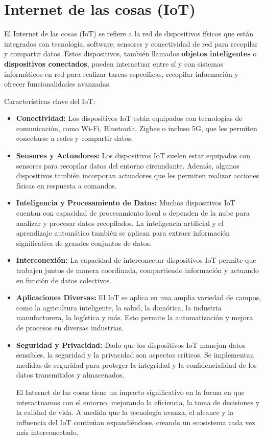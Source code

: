 \section{Internet de las cosas (IoT)}
El Internet de las cosas (IoT) se refiere a la red de dispositivos físicos que están integrados con tecnología, software, sensores y conectividad de red para recopilar y compartir datos. Estos dispositivos, también llamados \textbf{objetos inteligentes}  o \textbf{dispositivos conectados}, pueden interactuar entre sí y con sistemas informáticos en red para realizar tareas específicas, recopilar información y ofrecer funcionalidades avanzadas.

Características clave del IoT:
\begin{itemize}
\item \textbf{Conectividad:}
Los dispositivos IoT están equipados con tecnologías de comunicación, como Wi-Fi, Bluetooth, Zigbee o incluso 5G, que les permiten conectarse a redes y compartir datos.

\item \textbf{Sensores y Actuadores:}
Los dispositivos IoT suelen estar equipados con sensores para recopilar datos del entorno circundante. Además, algunos dispositivos también incorporan actuadores que les permiten realizar acciones físicas en respuesta a comandos.

\item \textbf{Inteligencia y Procesamiento de Datos:}
Muchos dispositivos IoT cuentan con capacidad de procesamiento local o dependen de la nube para analizar y procesar datos recopilados. La inteligencia artificial y el aprendizaje automático también se aplican para extraer información significativa de grandes conjuntos de datos.

\item \textbf{Interconexión:}
La capacidad de interconectar dispositivos IoT permite que trabajen juntos de manera coordinada, compartiendo información y actuando en función de datos colectivos.

\item \textbf{Aplicaciones Diversas:}
El IoT se aplica en una amplia variedad de campos, como la agricultura inteligente, la salud, la domótica, la industria manufacturera, la logística y más. Esto permite la automatización y mejora de procesos en diversas industrias.

\item \textbf{Seguridad y Privacidad:}
Dado que los dispositivos IoT manejan datos sensibles, la seguridad y la privacidad son aspectos críticos. Se implementan medidas de seguridad para proteger la integridad y la confidencialidad de los datos transmitidos y almacenados.

El Internet de las cosas tiene un impacto significativo en la forma en que interactuamos con el entorno, mejorando la eficiencia, la toma de decisiones y la calidad de vida. A medida que la tecnología avanza, el alcance y la influencia del IoT continúan expandiéndose, creando un ecosistema cada vez más interconectado.
\end{itemize}
